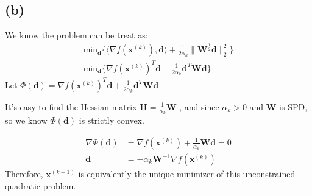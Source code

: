 \documentclass{article}
\begin{document}
\subsection*{(b)}
We know the problem can be treat as:
\begin{align*}
    \text{min}_{\bm{d}} \{\langle \nabla f(\bm{x}^{(k)}), \bm{d}\rangle + \frac{1}{2\alpha_k} \|\bm{W}^{\frac{1}{2}}\bm{d}\|_2^2\} \\
    \text{min}_{\bm{d}} \{\nabla f(\bm{x}^{(k)})^T\bm{d} + \frac{1}{2\alpha_k} \bm{d}^T\bm{W}\bm{d}\}
\end{align*}
Let \(\Phi(\bm{d}) = \nabla f(\bm{x}^{(k)})^T\bm{d} + \frac{1}{2\alpha_k} \bm{d}^T\bm{W}\bm{d}\)

It's easy to find the Hessian matrix \(\bm{H} = \frac{1}{\alpha_k} \bm{W}\)
, and since \(\alpha_k > 0\) and \(\bm{W}\) is SPD, so we know \(\Phi(\bm{d})\) is strictly convex.

\begin{align*}
    \nabla \Phi(\bm{d}) &= \nabla f(\bm{x}^{(k)}) + \frac{1}{\alpha_k} \bm{W}\bm{d} = 0\\
    \bm{d} &= -\alpha_k \bm{W}^{-1} \nabla f(\bm{x}^{(k)}) 
\end{align*}
Therefore, \(\bm{x}^{(k + 1)}\) is equivalently the unique minimizer of this unconstrained quadratic problem.
\end{document}
